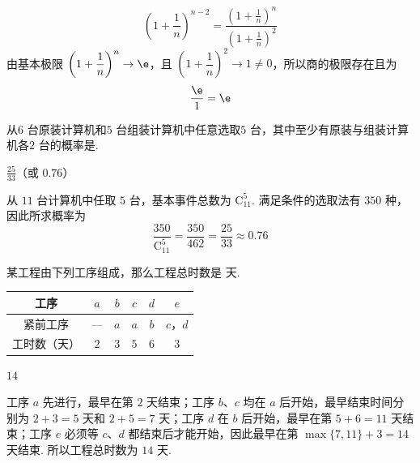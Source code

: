 \begin{solution}
\[
\left(1+\frac1n\right)^{n-2}=\frac{\left(1+\frac1n\right)^n}{\left(1+\frac1n\right)^2}
\]
由基本极限 \(\left(1+\dfrac1n\right)^n\to\e\)，且 \(\left(1+\dfrac1n\right)^2\to1\ne0\)，所以商的极限存在且为
\[
\frac{\e}{1}=\e
\]
\end{solution}

\begin{problem}[B]
从\(6\text{ 台}\)原装计算机和\(5\text{ 台}\)组装计算机中任意选取\(5\text{ 台}\)，其中至少有原装与组装计算机各\(2\text{ 台}\)的概率是\fillinblank{}.
\end{problem}

\begin{answer}
\(\frac{25}{33}\)（或 \(0.76\)）
\end{answer}

\begin{solution}
从 \(11\) 台计算机中任取 \(5\) 台，基本事件总数为 \(\mathrm C_{11}^5\). 满足条件的选取法有 \(350\) 种，因此所求概率为
\[
\frac{350}{\mathrm C_{11}^5}=\frac{350}{462}=\frac{25}{33}\approx0.76
\]
\end{solution}

\begin{problem}[B]
某工程由下列工序组成，那么工程总时数是\fillinblank{} \(\text{天}\).

\begin{center}
\begin{tabular}{|c|c|c|c|c|c|}
\hline
工序 & \(a\) & \(b\) & \(c\) & \(d\) & \(e\) \\
\hline
紧前工序 & — & \(a\) & \(a\) & \(b\) & \(c\)，\(d\) \\
\hline
工时数（天） & \(2\) & \(3\) & \(5\) & \(6\) & \(3\) \\
\hline
\end{tabular}
\end{center}
\end{problem}

\begin{answer}
\(14\)
\end{answer}

\begin{solution}
工序 \(a\) 先进行，最早在第 \(2\) 天结束；工序 \(b\)、\(c\) 均在 \(a\) 后开始，最早结束时间分别为 \(2+3=5\) 天和 \(2+5=7\) 天；工序 \(d\) 在 \(b\) 后开始，最早在第 \(5+6=11\) 天结束；工序 \(e\) 必须等 \(c\)、\(d\) 都结束后才能开始，因此最早在第 \(\max\{7,11\}+3=14\) 天结束. 所以工程总时数为 \(14\) 天.
\end{solution}

